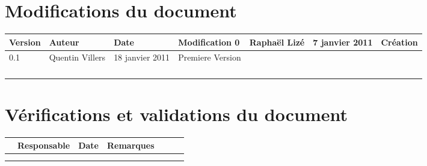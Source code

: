 
\section*{Modifications du document}

\begin{center}
\begin{longtable}{|m{14mm}|m{36mm}|m{36mm}|m{60mm}|}
\hline
Version & Auteur & Date & Modification\endhead \hline
0
& %
Raphaël Lizé
& %
7 janvier 2011
& %
Création
\\\hline
0.1
& %
Quentin Villers
& %
18 janvier 2011
& %
Premiere Version
\\\hline
& %
& %
& %
\\\hline
& %
& %
& %
\\\hline
& %
& %
& %
\\\hline
& %
& %
& %
\\\hline
\end{longtable}
\end{center}


\section*{Vérifications et validations du document}

\begin{center}
\begin{longtable}{|m{15mm}|m{36mm}|m{36mm}|m{60mm}|}
\hline
 & Responsable & Date & Remarques\endhead \hline
& %
& %
& %
\\\hline

& %

& %

& %

\\\hline

& %

& %

& %

\\\hline
\end{longtable}
\end{center}

\pagebreak

